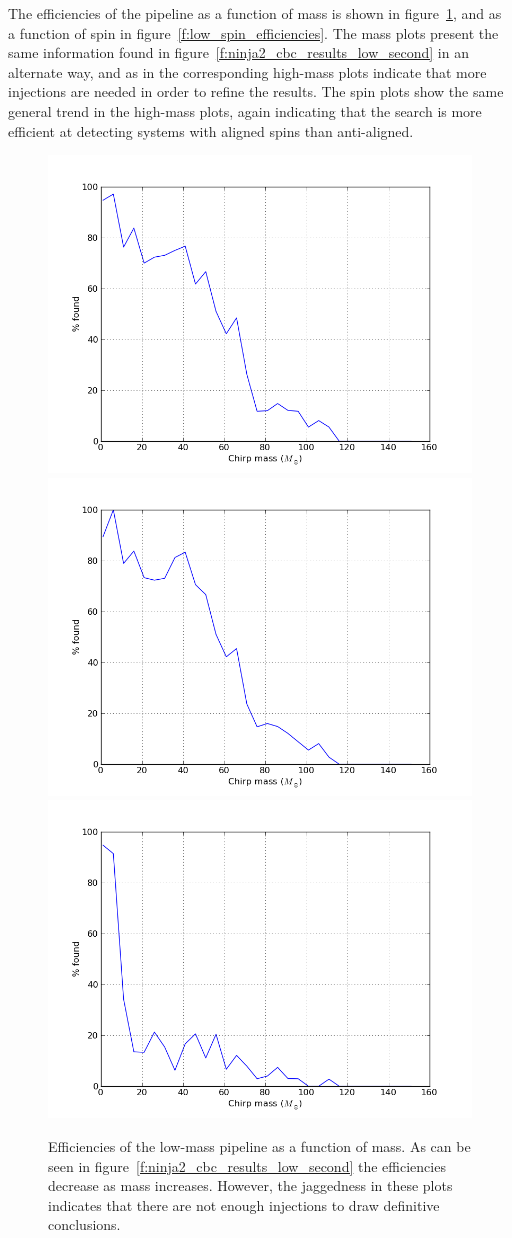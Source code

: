 The efficiencies of the pipeline as a function of mass is shown in
figure~\ref{f:low_mass_efficiencies}, and as a function of spin in
figure~\ref{f:low_spin_efficiencies}.  The mass plots present the
same information found in figure~\ref{f:ninja2_cbc_results_low_second}
in an alternate way, and as in the corresponding high-mass plots
indicate that more injections are needed in order to refine the
results.  The spin plots show the same general trend in the high-mass
plots, again indicating that the search is more efficient at detecting
systems with aligned spins than anti-aligned.

\begin{figure}
  \includegraphics[width=0.5\linewidth]{figures/ninja2_results/H_second_mass_low_efficiency}
  \includegraphics[width=0.5\linewidth]{figures/ninja2_results/L_second_mass_low_efficiency} \\
  \includegraphics[width=0.5\linewidth]{figures/ninja2_results/V_second_mass_low_efficiency}
  \caption[Efficiency of the low-mass pipeline as a function of mass]{
  \label{f:low_mass_efficiencies}
Efficiencies of the low-mass pipeline as a function of mass.  As
can be seen in figure~\ref{f:ninja2_cbc_results_low_second} the
efficiencies decrease as mass increases.  However, the jaggedness in
these plots indicates that there are not enough injections to draw
definitive conclusions.
}
\end{figure}%

